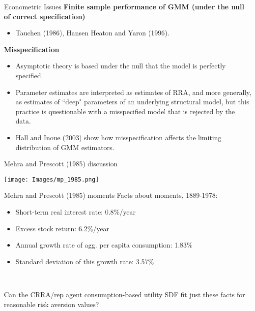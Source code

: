 \documentclass[xcolor=table, aspectratio=169]{beamer}
\newcommand{\alertbf}[1]{\alert{\textbf{#1}}}
\begin{document}
\begin{frame}{Econometric Issues}
\alertbf{Finite sample performance of GMM (under the null of correct specification)}

\begin{itemize}
\item Tauchen (1986), Hansen Heaton and Yaron (1996).
\end{itemize}

\alertbf{Misspecification}

\begin{itemize}
\item Asymptotic theory is based under the null that the model is perfectly specified.

\item Parameter estimates are interpreted as estimates of RRA, and more generally, as estimates of ``deep" parameters of an underlying structural model, but this practice is questionable with a misspecified model that is rejected by the data.

\item Hall and Inoue (2003) show how misspecification affects the limiting distribution of GMM estimators. 
\end{itemize}

\end{frame}


\begin{frame}{Mehra and Prescott (1985) discussion}
    \begin{center}
\texttt{[image: Images/mp\_1985.png]}
\end{center}
\end{frame}

\begin{frame}{Mehra and Prescott (1985) moments}
Facts about moments, 1889-1978:
\begin{itemize}
\item Short-term real interest rate: 0.8\%/year
\item Excess stock return: 6.2\%/year
\item Annual growth rate of agg. per capita consumption: 1.83\%
\item Standard deviation of this growth rate: 3.57\%
\end{itemize}

~

Can the CRRA/rep agent consumption-based utility SDF fit just these facts for reasonable risk aversion values?
\end{frame}
\end{document}
